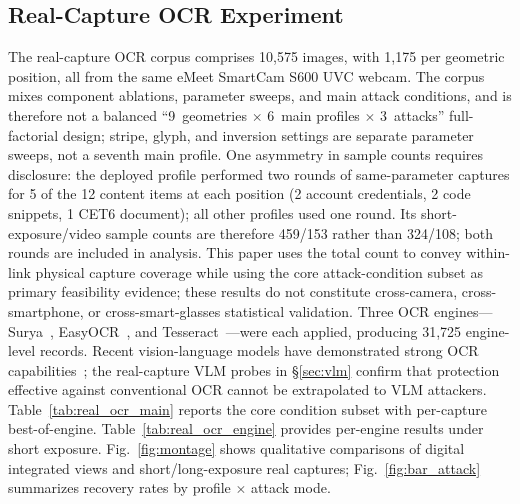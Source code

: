 \documentclass{ieeeaccess}
\begin{document}
\subsection{Real-Capture OCR Experiment}
\label{sec:real_capture}

The real-capture OCR corpus comprises 10,575 images, with 1,175 per geometric position, all from the same eMeet SmartCam S600 UVC webcam. The corpus mixes component ablations, parameter sweeps, and main attack conditions, and is therefore not a balanced ``9~geometries $\times$ 6~main profiles $\times$ 3~attacks'' full-factorial design; stripe, glyph, and inversion settings are separate parameter sweeps, not a seventh main profile. One asymmetry in sample counts requires disclosure: the deployed profile performed two rounds of same-parameter captures for 5 of the 12 content items at each position (2 account credentials, 2 code snippets, 1 CET6 document); all other profiles used one round. Its short-exposure/video sample counts are therefore 459/153 rather than 324/108; both rounds are included in analysis. This paper uses the total count to convey within-link physical capture coverage while using the core attack-condition subset as primary feasibility evidence; these results do not constitute cross-camera, cross-smartphone, or cross-smart-glasses statistical validation. Three OCR engines---Surya~\cite{b_surya2024}, EasyOCR~\cite{b_easyocr2020}, and Tesseract~\cite{b_smith2007}---were each applied, producing 31,725 engine-level records. Recent vision-language models have demonstrated strong OCR capabilities~\cite{b_shi2023}; the real-capture VLM probes in \S\ref{sec:vlm} confirm that protection effective against conventional OCR cannot be extrapolated to VLM attackers. Table~\ref{tab:real_ocr_main} reports the core condition subset with per-capture best-of-engine. Table~\ref{tab:real_ocr_engine} provides per-engine results under short exposure. Fig.~\ref{fig:montage} shows qualitative comparisons of digital integrated views and short/long-exposure real captures; Fig.~\ref{fig:bar_attack} summarizes recovery rates by profile $\times$ attack mode.
\end{document}
